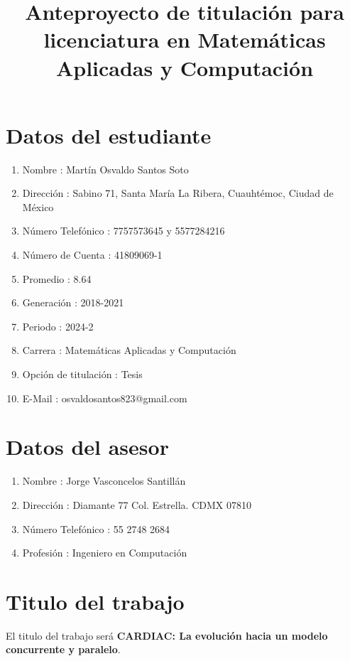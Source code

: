 \documentclass[letterpaper,12pt,oneside]{article}
\title{Anteproyecto de titulación para licenciatura en Matemáticas Aplicadas y Computación}
\begin{document}
    \maketitle
	
	\clearpage
	
	\section{Datos del estudiante}
	
	\begin{enumerate}
		\item Nombre : Martín Osvaldo Santos Soto
		\item Dirección : Sabino 71, Santa María La Ribera, Cuauhtémoc, Ciudad de México
		\item Número Telefónico : 7757573645 y 5577284216
		\item Número de Cuenta : 41809069-1
		\item Promedio : 8.64
		\item Generación : 2018-2021
		\item Periodo : 2024-2
		\item Carrera : Matemáticas Aplicadas y Computación
		\item Opción de titulación : Tesis
		\item E-Mail : osvaldosantos823@gmail.com
	\end{enumerate}
	
	\section{Datos del asesor}
		\begin{enumerate}
			\item Nombre :  Jorge Vasconcelos Santillán
		    \item Dirección :  Diamante 77 Col. Estrella. CDMX 07810
			\item Número Telefónico :  55 2748 2684
			\item Profesión : Ingeniero en Computación
		
		\end{enumerate}		

	
		\section{Titulo del trabajo}
		
		El titulo del trabajo será \textbf{CARDIAC: La evolución hacia un modelo concurrente y paralelo}.
		
\end{document}

